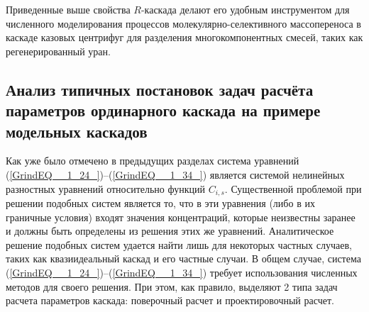 Приведенные выше свойства $R$-каскада делают его удобным инструментом для численного моделирования процессов молекулярно-селективного массопереноса в каскаде казовых центрифуг для разделения многокомпонентных смесей, таких как регенерированный уран.

\subsection{Анализ типичных постановок задач расчёта параметров ординарного каскада на примере модельных каскадов}\label{part2_discrep}

Как уже было отмечено в предыдущих разделах система уравнений (\ref{GrindEQ__1_24_})--(\ref{GrindEQ__1_34_}) является системой нелинейных разностных уравнений относительно функций $C_{i,s}$. Существенной проблемой при решении подобных систем является то, что в эти уравнения (либо в их граничные условия) входят значения концентраций, которые неизвестны заранее и должны быть определены из решения этих же уравнений. Аналитическое решение подобных систем удается найти лишь для некоторых частных случаев, таких как квазиидеальный каскад и его частные случаи. В общем случае, система (\ref{GrindEQ__1_24_})--(\ref{GrindEQ__1_34_}) требует использования численных методов для своего решения. При этом, как правило, выделяют 2 типа задач расчета параметров каскада: поверочный расчет и проектировочный расчет.

